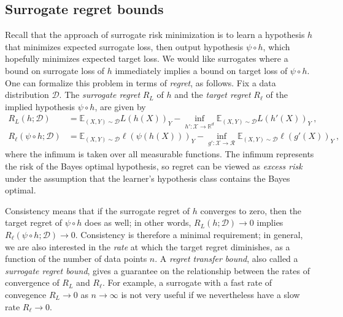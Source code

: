\documentclass[11pt]{article}
\newcommand{\reals}{\mathbb{R}}
\newcommand{\D}{\mathcal{D}}
\newcommand{\E}{\mathbb{E}}
\newcommand{\R}{\mathcal{R}}
\newcommand{\X}{\mathcal{X}}
\begin{document}
\subsection{Surrogate regret bounds}\label{subsec:regret-bounds}
Recall that the approach of surrogate risk minimization is to learn a hypothesis $h$ that minimizes expected surrogate loss, then output hypothesis $\psi \circ h$, which hopefully minimizes expected target loss.
We would like surrogates where a bound on surrogate loss of $h$ immediately implies a bound on target loss of $\psi \circ h$.
One can formalize this problem in terms of \emph{regret}, as follows.
Fix a data distribution $\D$.
The \emph{surrogate regret} $R_L$ of $h$ and the \emph{target regret} $R_{\ell}$ of the implied hypothesis $\psi \circ h$, are given by
\begin{align*}
  R_L(h;\D) &= \E_{(X,Y)\sim\D} L(h(X))_Y - \inf_{h':\X\to\reals^d} \E_{(X,Y)\sim\D} L(h'(X))_Y~,
  \\
  R_\ell(\psi\circ h;\D) &= \E_{(X,Y)\sim\D} \ell(\psi(h(X)))_Y - \inf_{g':\X\to\R} \E_{(X,Y)\sim\D} \ell(g'(X))_Y~,
\end{align*}
where the infimum is taken over all measurable functions.
The infimum represents the risk of the Bayes optimal hypothesis, so regret can be viewed as \emph{excess risk} under the assumption that the learner's hypothesis class contains the Bayes optimal.

Consistency means that if the surrogate regret of $h$ converges to zero, then the target regret of $\psi \circ h$ does as well; in other words, $R_L(h;\D) \to 0$ implies $R_{\ell}(\psi \circ h;\D) \to 0$.
Consistency is therefore a minimal requirement; in general, we are also interested in the \emph{rate} at which the target regret diminishes, as a function of the number of data points $n$.
A \emph{regret transfer bound}, also called a \emph{surrogate regret bound}, gives a guarantee on the relationship between the rates of convergence of $R_L$ and $R_{\ell}$.
For example, a surrogate with a fast rate of convegence $R_L \to 0$ as $n \to \infty$ is not very useful if we nevertheless have a slow rate $R_{\ell} \to 0$.
\end{document}
